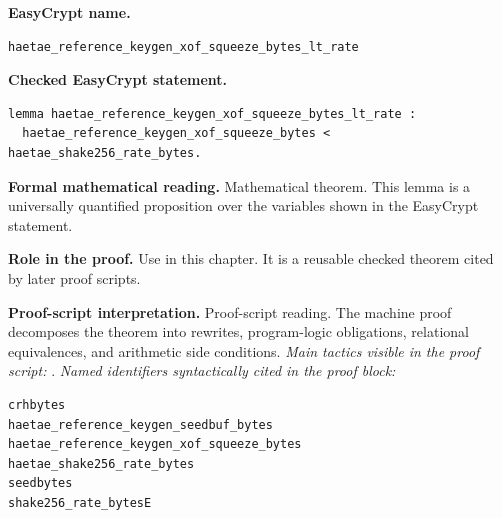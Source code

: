 \begin{formaltheorem}
\noindent\textbf{EasyCrypt name.}
\begin{lstlisting}[language=EasyCrypt,basicstyle=\ttfamily\scriptsize]
haetae_reference_keygen_xof_squeeze_bytes_lt_rate
\end{lstlisting}
\noindent\textbf{Checked EasyCrypt statement.}
\begin{lstlisting}[language=EasyCrypt,basicstyle=\ttfamily\scriptsize]
lemma haetae_reference_keygen_xof_squeeze_bytes_lt_rate :
  haetae_reference_keygen_xof_squeeze_bytes < haetae_shake256_rate_bytes.
\end{lstlisting}
\noindent\textbf{Formal mathematical reading.}
Mathematical theorem. This lemma is a universally quantified proposition over the variables shown in the EasyCrypt statement.

\noindent\textbf{Role in the proof.}
Use in this chapter. It is a reusable checked theorem cited by later proof scripts.

\noindent\textbf{Proof-script interpretation.}
Proof-script reading. The machine proof decomposes the theorem into rewrites, program-logic obligations, relational equivalences, and arithmetic side conditions.
\emph{Main tactics visible in the proof script:} .
\emph{Named identifiers syntactically cited in the proof block:}
\begin{lstlisting}[language=EasyCrypt,basicstyle=\ttfamily\scriptsize]
crhbytes
haetae_reference_keygen_seedbuf_bytes
haetae_reference_keygen_xof_squeeze_bytes
haetae_shake256_rate_bytes
seedbytes
shake256_rate_bytesE
\end{lstlisting}

\end{formaltheorem}

